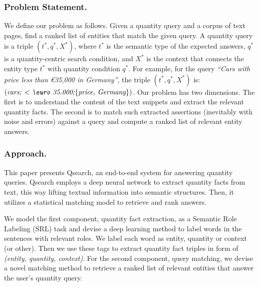  
\subsubsection{Problem Statement.}
We define our problem as follows. Given a quantity query and a corpus of text pages, 
find a ranked list of entities that match the given query.
A quantity query is a triple $(t^*,q^*, X^*)$, where 
$t^*$ is the semantic type of the expected answers, 
$q^*$ is a quantity-centric search condition, and 
$X^*$ is the context that connects the entity type  $t^*$ with quantity condition $q^*$. For example, for the query  \textit{``Cars with price less than \euro 35,000 in Germany''}, the triple $(t^*,q^*, X^*)$ is: $(\textit{cars; < \euro 35.000;} \{\textit{price, Germany}\})$.
%
Our problem has two dimensions.
The first is to understand the content of the text snippets and extract the relevant quantity facts. The second is to match such extracted
assertions (inevitably with noise and errors) against a query
and compute a ranked list of relevant entity answers.


\subsubsection{Approach.}
This paper presents Qsearch, an end-to-end system for answering quantity queries. Qsearch employs a deep neural network
to extract quantity facts from text,
this way lifting textual information into semantic structures.
Then, it utilizes 
a statistical matching model to retrieve and rank answers.

We model the first component, quantity fact extraction, as a Semantic Role Labeling (SRL) task \cite{DBLP:journals/coling/GildeaJ02} and devise a 
deep learning
method to label words in the sentences with relevant roles. We label each word as entity, quantity or context (or other). Then we use these tags to extract quantity fact triples in form of \textit{(entity, quantity, context)}.
%
For the second component, query matching, we devise a 
novel
matching method to retrieve a ranked list of relevant entities that answer the user's quantity query.

